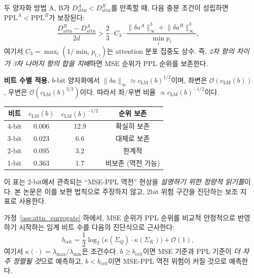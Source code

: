 \begin{proposition}
\label{prop:rank_preservation}
두 양자화 방법 A, B가 $D_{\mathrm{attn}}^A < D_{\mathrm{attn}}^B$를 만족할 때, 다음 충분 조건이 성립하면 $\mathrm{PPL}^A < \mathrm{PPL}^B$가 보장된다:
\begin{equation}
\frac{D_{\mathrm{attn}}^B - D_{\mathrm{attn}}^A}{2d} > \frac{2}{3} \cdot C_3 \cdot \frac{\lVert \delta a^A \rVert_\infty^3 + \lVert \delta a^B \rVert_\infty^3}{\min_i p_i},
\label{eq:rank_condition}
\end{equation}
여기서 $C_3 = \max_t (1/\min_i p_{t,i})$는 attention 분포 집중도 상수. 즉, \emph{2차 항의 차이가 3차 나머지 항의 합을 지배}하면 MSE 순위가 PPL 순위를 보존한다.
\end{proposition}

\begin{theorycomment}
\textbf{비트 수별 적용.} $b$-bit 양자화에서 $\lVert \delta a \rVert_\infty \approx c_{\mathrm{LM}}(b)^{1/2}$이며, 좌변은 $\mathcal{O}(c_{\mathrm{LM}}(b))$, 우변은 $\mathcal{O}(c_{\mathrm{LM}}(b)^{3/2})$이다. 따라서 좌/우변 비율 $\propto c_{\mathrm{LM}}(b)^{-1/2}$이다.
\begin{center}
\begin{tabular}{cccc}
\toprule
비트 & $c_{\mathrm{LM}}(b)$ & $c_{\mathrm{LM}}(b)^{-1/2}$ & 순위 보존 \\
\midrule
4-bit & 0.006 & 12.9 & 확실히 보존 \\
3-bit & 0.023 & 6.6  & 대체로 보존 \\
2-bit & 0.095 & 3.2  & 한계적 \\
1-bit & 0.363 & 1.7  & 비보존 (역전 가능) \\
\bottomrule
\end{tabular}
\end{center}
이 표는 2-bit에서 관측되는 ``MSE-PPL 역전'' 현상을 \emph{설명하기 위한 정량적 읽기틀}이다. 본 논문은 이를 보편 법칙으로 주장하지 않고, 2bit 위험 구간을 진단하는 보조 지표로 사용한다.
\end{theorycomment}

\begin{proposition}
\label{prop:bcrit}
가정~\ref{ass:attn_surrogate} 하에서, MSE 순위가 PPL 순위를 비교적 안정적으로 반영하기 시작하는 임계 비트 수를 다음의 진단식으로 근사한다:
\begin{equation}
b_{\mathrm{crit}} = \frac{1}{2} \log_2\!\bigl(\kappa(\Sigma_Q) \cdot \kappa(\Sigma_K)\bigr) + \mathcal{O}(1),
\label{eq:bcrit}
\end{equation}
여기서 $\kappa(\cdot) = \lambda_{\max}/\lambda_{\min}$은 조건수다. $b \geq b_{\mathrm{crit}}$이면 MSE 기준과 PPL 기준이 \emph{더 자주 정렬될 것}으로 예측하고, $b < b_{\mathrm{crit}}$이면 MSE-PPL 역전 위험이 커질 것으로 예측한다.
\end{proposition}

